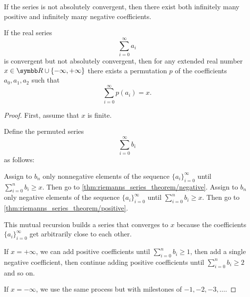 \begin{theorem}\label{thm:riemanns_series_theorem}\cite[]{Фихтенгольц1968}
  If the series is not absolutely convergent, then there exist both infinitely many positive and infinitely many negative coefficients.

  If the real series
  \begin{equation*}
    \sum_{i=0}^\infty a_i
  \end{equation*}
  is convergent but not absolutely convergent, then for any extended real number \( x \in \R \cup \{ -\infty, +\infty \} \) there exists a permutation \( p \) of the coefficients \( a_0, a_1, a_2 \)
  such that
  \begin{equation*}
    \sum_{i=0}^\infty p(a_i) = x.
  \end{equation*}
\end{theorem}
\begin{proof}
  First, assume that \( x \) is finite.

  Define the permuted series
  \begin{equation*}
    \sum_{i=0}^\infty b_i
  \end{equation*}
  as follows:
  \begin{algenum}
     Assign to \( b_n \) only nonnegative elements of the sequence \( \{ a_i \}_{i=0}^\infty \) until \( \sum_{i=0}^n b_i \geq x \). Then go to \cref{thm:riemanns_series_theorem/negative}.
     Assign to \( b_n \) only negative elements of the sequence \( \{ a_i \}_{i=0}^\infty \) until \( \sum_{i=0}^n b_i \geq x \). Then go to \cref{thm:riemanns_series_theorem/positive}.
  \end{algenum}

  This mutual recursion builds a series that converges to \( x \) because the coefficients \( \{ a_i \}_{i=0}^\infty \) get arbitrarily close to each other.

  If \( x = +\infty \), we can add positive coefficients until \( \sum_{i=0}^n b_i \geq 1 \), then add a single negative coefficient, then continue adding positive coefficients until \( \sum_{i=0}^n b_i \geq 2 \) and so on.

  If \( x = -\infty \), we use the same process but with milestones of \( -1, -2, -3, \ldots \).
\end{proof}

